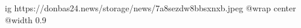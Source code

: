  
 
 
 
 

\ifcmt
  ig https://donbas24.news/storage/news/7a8sezdw8bbsxnxb.jpeg
  @wrap center
  @width 0.9
\fi
